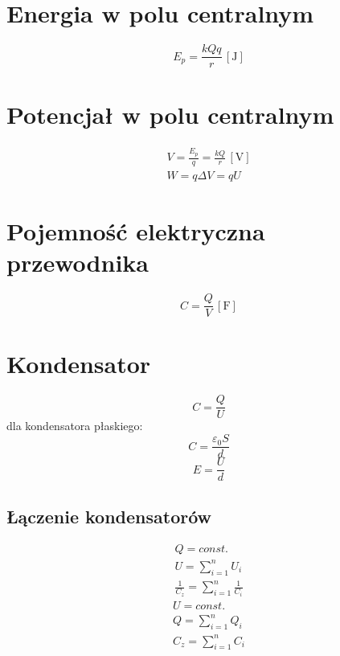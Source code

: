 \documentclass{report}
\numberwithin{equation}{chapter}
\newcommand{\unit}[1]{\,\left[\mathrm{#1}\right]}
\begin{document}
    \section{Energia w polu centralnym}
      \begin{equation}
        E_p = \frac{kQq}{r} \unit{J}
      \end{equation}
    \section{Potencjał w polu centralnym}
      \begin{gather}
        V = \frac{E_p}{q} = \frac{kQ}{r} \unit{V}\\
        W = q\Delta V = qU
      \end{gather}
    \section{Pojemność elektryczna przewodnika}
      \begin{equation}
        C = \frac{Q}{V} \unit{F}
      \end{equation}
    \section{Kondensator}
      \begin{equation}
        C= \frac{Q}{U}
      \end{equation}
      dla kondensatora płaskiego:
      \begin{equation}
        C= \frac{\varepsilon_0S}{d}
      \end{equation}
      \begin{equation}
        E = \frac{U}{d}
      \end{equation}
      \subsection{Łączenie kondensatorów}
        \begin{gather}
          Q = const.\\
          U = \sum_{i=1}^n U_i\\
          \frac{1}{C_z} = \sum_{i=1}^n \frac{1}{C_i}
        \end{gather}
        \begin{gather}
          U = const.\\
          Q = \sum_{i=1}^n Q_i\\
          C_z = \sum_{i=1}^n C_i
        \end{gather}
\end{document}
